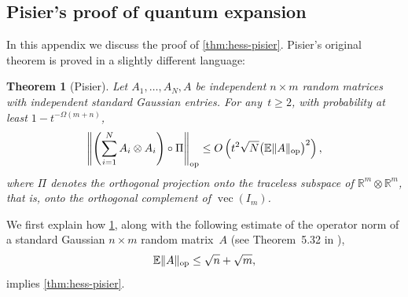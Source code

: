 \documentclass[aos]{imsart}
\newtheorem{theorem}{Theorem}[section]
\theoremstyle{definition}
\numberwithin{equation}{section}
\DeclareMathOperator{\op}{op}
\DeclareMathOperator{\vect}{vec}
\DeclarePairedDelimiter{\norm}{\lVert}{\rVert}
\newcommand{\R}{{\mathbb{R}}}
\newcommand{\ot}{\otimes}
\newcommand{\E}{\mathbb{E}}
\begin{document}
\begin{appendix}

\section{Pisier's proof of quantum expansion}\label{sec:pisier}
In this appendix we discuss the proof of \cref{thm:hess-pisier}.
Pisier's original theorem is proved in a slightly different language:

\begin{theorem}[Pisier]\label{thm:Pisier-expansion}
Let $A_1,\dots,A_N,A$ be independent $n \times m$ random matrices with independent standard Gaussian entries.
For any~$t \geq 2$, with probability at least $1 - t^{-\Omega(m+n)}$,
\begin{align*}
  \norm*{\left(\sum_{i=1}^N A_i \otimes A_i \right) \circ \Pi}_{\op}
  \leq O\left( t^2 \sqrt{N} \bigl( \E \norm{A}_{\op} \bigr)^2 \right),
\end{align*}
where $\Pi$ denotes the orthogonal projection onto the traceless subspace of $\R^m \ot \R^m$, that is, onto the orthogonal complement of $\vect(I_m)$.
\end{theorem}

We first explain how \cref{thm:Pisier-expansion}, along with the following estimate of the operator norm of a standard Gaussian $n \times m$ random matrix~$A$ (see Theorem~5.32 in \cite{vershynin2010introduction}),
\begin{equation}\label{eq:op norm upper bound}
  \E \norm{A}_{\op} \leq \sqrt{n} + \sqrt{m},
\end{equation}
implies \cref{thm:hess-pisier}.


\end{appendix}
\end{document}
